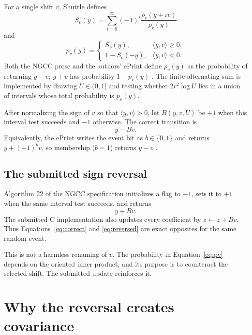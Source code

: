 \documentclass[11pt,a4paper]{article}
\begin{document}
For a single shift $v$, Shuttle defines
\[
 S_v(y)=\sum_{i=0}^{\infty}(-1)^i
              \frac{\rho_r(y+iv)}{\rho_r(y)}
\]
and
\begin{equation}
 p_v(y)=\begin{cases}
   S_v(y),&\langle y,v\rangle\ge 0,\\
   1-S_v(-y),&\langle y,v\rangle<0.
 \end{cases}
\label{eq:pv}
\end{equation}
Both the NGCC prose and the authors' ePrint define $p_v(y)$ as the probability
of returning $y-v$; $y+v$ has probability $1-p_v(y)$
\cite{Shuttle,MingEtAl}.  The finite alternating sum is implemented by drawing
$U\in(0,1]$ and testing whether $2r^2\log U$ lies in a union of intervals
whose total probability is $p_v(y)$.

After normalizing the sign of $v$ so that $\langle y,v\rangle>0$, let
$B(y,v,U)$ be $+1$ when this interval test succeeds and $-1$ otherwise.
The correct transition is
\begin{equation}
                         y-Bv.
\label{eq:correct}
\end{equation}
Equivalently, the ePrint writes the event bit as $b\in\{0,1\}$ and returns
$y+(-1)^bv$, so membership ($b=1$) returns $y-v$ \cite{MingEtAl}.

\subsection{The submitted sign reversal}
\label{sec:reversal}

Algorithm 22 of the NGCC specification initializes a flag to $-1$, sets it to
$+1$ when the same interval test succeeds, and returns
\begin{equation}
                         y+Bv.
\label{eq:reversed}
\end{equation}
The submitted C implementation also updates every coefficient by
$z\leftarrow z+Bv$.  Thus Equations~\eqref{eq:correct} and
\eqref{eq:reversed} are exact opposites for the same random event.

This is not a harmless renaming of $v$.  The probability in
Equation~\eqref{eq:pv} depends on the oriented inner product, and its purpose
is to counteract the selected shift.  The submitted update reinforces it.

\section{Why the reversal creates covariance}
\label{sec:covariance}
\end{document}
